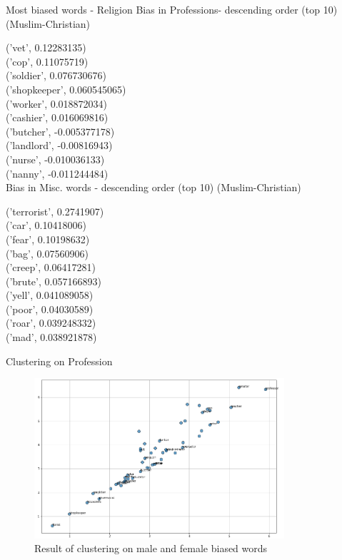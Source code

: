 \documentclass{beamer}
\begin{document}
		\begin{frame}[allowframebreaks]{Most biased words - Religion}
		Bias in Professions- descending order (top 10) (Muslim-Christian)
		
		('vet', 0.12283135)
\\
		('cop', 0.11075719)
\\
		('soldier', 0.076730676) \\
		('shopkeeper', 0.060545065) \\
		('worker', 0.018872034)
\\
		('cashier', 0.016069816)
\\
		('butcher', -0.005377178)
\\
		('landlord', -0.00816943)
\\
		('nurse', -0.010036133)
\\
		('nanny', -0.011244484) \\
		
		\vspace{5mm}
		Bias in Misc. words - descending order (top 10) (Muslim-Christian)
		
		('terrorist', 0.2741907)
\\
		('car', 0.10418006)
\\
		('fear', 0.10198632)
\\
		('bag', 0.07560906)
 \\
		('creep', 0.06417281)
 \\
		('brute', 0.057166893)
\\
		('yell', 0.041089058)
\\
		('poor', 0.04030589)
\\
		('roar', 0.039248332)
\\
		('mad', 0.038921878) \\
	\end{frame}
	
	
	\begin{frame}{Clustering on Profession}
		\vspace{3mm}
		\begin{figure}[H]
			\centerline{\includegraphics[width=25em]{biased_profession.png}}
			\caption{Result of clustering on male and female biased words}
			\label{profession-cluster-fig}
		\end{figure}
	\end{frame}
	
\end{document}
